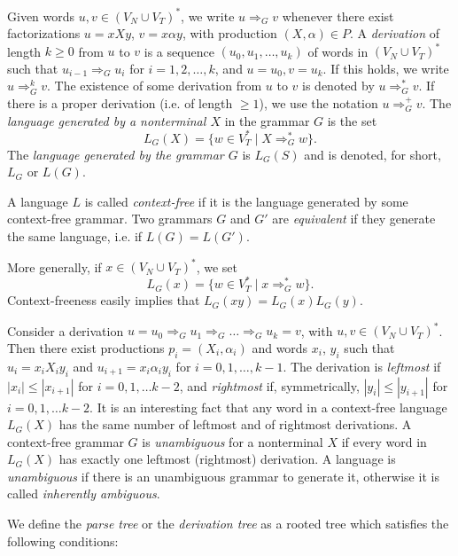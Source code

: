 Given words $u, v \in (V_N \cup V_T)^*$, we write $u \Rightarrow_G v$ whenever there exist factorizations $u = x X y$, $v = x \alpha y$, with production $(X, \alpha) \in P$. A \emph{derivation} of length $k \ge 0$ from $u$ to $v$ is a sequence $(u_0, u_1, \ldots, u_k)$ of words in $(V_N \cup V_T)^*$ such that $u_{i-1} \Rightarrow_G u_i$ for $i = 1, 2, \ldots, k$, and $u = u_0, v = u_k$. If this holds, we write $u \Rightarrow^k_G v$. The existence of some derivation from $u$ to $v$ is denoted by $u \Rightarrow^*_G v$. If there is a proper derivation
(i.e. of length $\ge 1$), we use the notation $u \Rightarrow^+_G v$. The \emph{language generated by a nonterminal $X$} in the grammar $G$ is the set
$$L_G(X) = \{w \in V_T^* \mid X \Rightarrow^*_G w\}.$$ The \emph{language generated by the grammar $G$} is $L_G(S)$ and is denoted, for short, $L_G$ or $L(G)$.

A language $L$ is called \emph{context-free} if it is the language generated by some context-free grammar. Two grammars $G$ and $G'$ are \emph{equivalent} if they generate the same language, i.e. if $L(G) = L(G')$.

More generally, if $x \in (V_N \cup V_T)^*$, we set $$L_G(x) = \{w \in V_T^* \mid x \Rightarrow^*_G w\}.$$ Context-freeness easily implies that $L_G(xy) = L_G(x) L_G(y)$.

Consider a derivation $u = u_0 \Rightarrow_G u_1 \Rightarrow_G \ldots \Rightarrow_G u_k = v$, with $u, v \in (V_N \cup V_T)^*$. Then there exist productions $p_i = (X_i, \alpha_i)$ and words $x_i$, $y_i$ such that $u_i = x_i X_i y_i$ and $u_{i+1} = x_i \alpha_i y_i$ for $i = 0, 1, \ldots, k-1$. The derivation is \emph{leftmost} if $|x_i| \le |x_{i+1}|$ for $i = 0, 1, \ldots k-2$, and \emph{rightmost} if, symmetrically, $|y_i| \le |y_{i+1}|$ for $i = 0, 1, \ldots k-2$. It is an interesting fact that any word in a context-free language $L_G(X)$ has the same number of leftmost and of rightmost derivations. A context-free grammar $G$ is \emph{unambiguous} for a nonterminal $X$ if every word in $L_G(X)$ has exactly one leftmost (rightmost) derivation. A language is \emph{unambiguous} if there is an unambiguous grammar to generate it, otherwise it is called \emph{inherently ambiguous}.

We define the \emph{parse tree} or the \emph{derivation tree} as a rooted tree which satisfies the following conditions:

